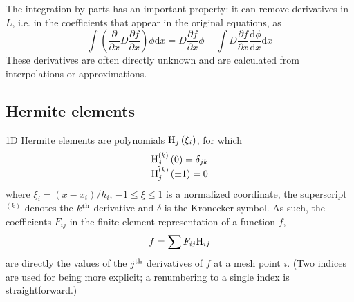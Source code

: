 The integration by parts has an important property: it can
remove derivatives in $L$, i.e. in the coefficients that appear
in the original equations, as
\begin{equation}
\int {\left( {\frac{\partial }{{\partial x}}D\frac{{\partial f}}{{\partial x}}} \right)\phi {\text{d}}x}  = D\frac{{\partial f}}{{\partial x}}\phi  - \int {D\frac{{\partial f}}{{\partial x}}\frac{{{\text{d}}\phi }}{{{\text{d}}x}}{\text{d}}x} 
\end{equation}
These derivatives are often 
directly unknown and are calculated from interpolations or
approximations.


\subsection{Hermite elements} %
\label{ssub:hermite_elements}
1D Hermite elements are polynomials ${\rm H}_{j}\left(\xi_i\right)$,
for which
\begin{equation}
\begin{array}{*{20}{c}}
  {{\rm H} _{j}^{\left( k \right)}\left( 0 \right) = {\delta _{jk}}} \\ 
  {{\rm H} _{j}^{\left( k \right)}\left( { \pm 1} \right) = 0} 
\end{array}
\end{equation}
where $\xi_i=\left( x - x_i \right) / h_i$, $- 1 \leqslant \xi  \leqslant 1$ is a normalized coordinate,
the superscript $^{\left( k \right)}$ denotes the $k^{\rm th}$
derivative and $\delta$ is the Kronecker symbol.
As such, the coefficients $F_{ij}$ in the finite element representation of
a function $f$,
\begin{equation}
f = \sum {{F_{ij}}{{\rm H} _{ij}}} 
\end{equation}
are directly the values of the $j^{\rm th}$
derivatives of $f$ at a mesh point $i$.
(Two indices are used for being more explicit; a renumbering
to a single index is straightforward.)

